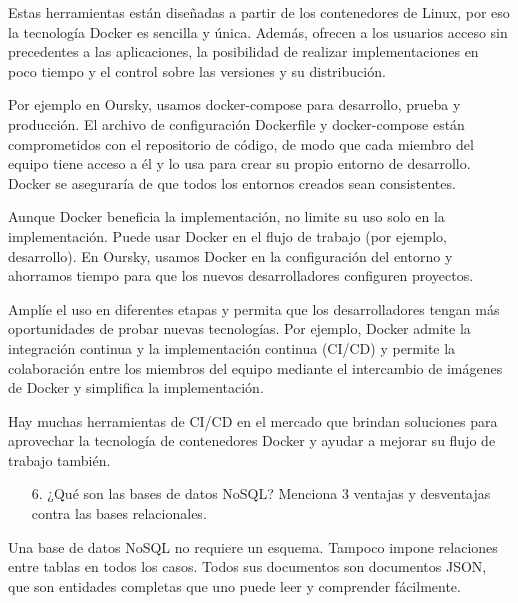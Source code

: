 \documentclass{article}
\begin{document}
Estas herramientas están diseñadas a partir de los contenedores de Linux, por eso la tecnología Docker es sencilla y única. Además, ofrecen a los usuarios acceso sin precedentes a las aplicaciones, la posibilidad de realizar implementaciones en poco tiempo y el control sobre las versiones y su distribución. 

Por ejemplo en Oursky, usamos docker-compose para desarrollo, prueba y producción. El archivo de configuración Dockerfile y docker-compose están comprometidos con el repositorio de código, de modo que cada miembro del equipo tiene acceso a él y lo usa para crear su propio entorno de desarrollo. Docker se aseguraría de que todos los entornos creados sean consistentes. 

Aunque Docker beneficia la implementación, no limite su uso solo en la implementación. Puede usar Docker en el flujo de trabajo (por ejemplo, desarrollo). En Oursky, usamos Docker en la configuración del entorno y ahorramos tiempo para que los nuevos desarrolladores configuren proyectos. 

Amplíe el uso en diferentes etapas y permita que los desarrolladores tengan más oportunidades de probar nuevas tecnologías. Por ejemplo, Docker admite la integración continua y la implementación continua (CI/CD) y permite la colaboración entre los miembros del equipo mediante el intercambio de imágenes de Docker y simplifica la implementación. 

Hay muchas herramientas de CI/CD en el mercado que brindan soluciones para aprovechar la tecnología de contenedores Docker y ayudar a mejorar su flujo de trabajo también.    
    
    
\begin{itemize}
    \item[6.]¿Qu\'e son las bases de datos NoSQL? Menciona 3 ventajas y desventajas contra las bases relacionales.
\end{itemize}
Una base de datos NoSQL  no requiere un esquema. Tampoco impone relaciones entre tablas en todos los casos. Todos sus documentos son documentos JSON, que son entidades completas que uno puede leer y comprender fácilmente. 
\end{document}

